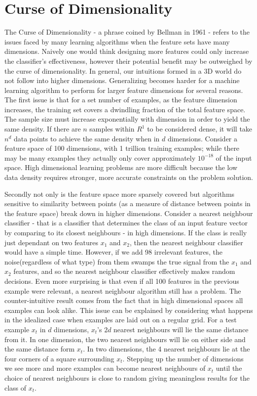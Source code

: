 	\section{Curse of Dimensionality}
The Curse of Dimensionality - a phrase coined by Bellman in 1961 - refers to the issues faced by many learning algorithms when the feature sets have many dimensions\citep{domingos2012few}.
Naively one would think designing more features could only increase the classifier's effectiveness, however their potential benefit may be outweighed by the curse of dimensionality. 
In general, our intuitions formed in a 3D world do not follow into higher dimensions.
Generalizing becomes harder for a machine learning algorithm to perform for larger feature dimensions for several reasons.
The first issue is that for a set number of examples, as the feature dimension increases, the training set covers a dwindling fraction of the total feature space.
The sample size must increase exponentially with dimension in order to yield the same density\citep{cherkassky2007learning}.
If there are $n$ samples within $R^1$ to be considered dense, it will take $n^d$ data points to achieve the same density when in $d$ dimensions.
Consider a feature space of 100 dimensions, with 1 trillion training examples; while there may be many examples they actually only cover approximately $10^{-18}$ of the input space.
High dimensional learning problems are more difficult because the low data density requires stronger, more accurate constraints on the problem solution\citep{cherkassky2007learning}.

Secondly not only is the feature space more sparsely covered but algorithms sensitive to similarity between points (as a measure of distance between points in the feature space) break down in higher dimensions.
Consider a nearest neighbour classifier - that is a classifier that determines the class of an input feature vector by comparing to its closest neighbours - in high dimensions.
If the class is really just dependant on two features $x_1$ and $x_2$, then the nearest neighbour classifier would have a simple time.
However, if we add 98 irrelevant features, the noise(regardless of what type) from them swamps the true signal from the $x_1$ and $x_2$ features, and so the nearest neighbour classifier effectively makes random decisions.
Even more surprising is that even if all 100 features in the previous example were relevant, a nearest neighbour algorithm still has a problem.
The counter-intuitive result comes from the fact that in high dimensional spaces all examples can look alike.
This issue can be explained by considering what happens in the idealized case when examples are laid out on a regular grid.
For a test example $x_t$ in $d$ dimensions, $x_t$'s $2d$ nearest neighbours will lie the same distance from it.
In one dimension, the two nearest neighbours will lie on either side and the same distance form $x_t$.
In two dimensions, the 4 nearest neighbours lie at the four corners of a square surrounding $x_t$.
Stepping up the number of dimensions we see more and more examples can become nearest neighbours of $x_t$ until the choice of nearest neighbours is close to random giving meaningless results for the class of $x_t$.


